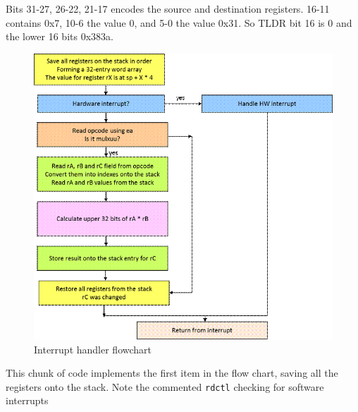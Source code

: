\documentclass[../notes.tex]{subfiles}
\begin{document}
Bits 31-27, 26-22, 21-17 encodes the source and destination registers. 16-11 contains 0x7, 10-6 the value 0, and 5-0 the value 0x31. So TLDR bit 16 is 0 and the lower 16 bits 0x383a.



\begin{figure}[H]
	\centering
	\includegraphics[width=0.8\linewidth]{img/image_2022-11-03-14-30-03.png}
	\caption{Interrupt handler flowchart}
\end{figure}



This chunk of code implements the first item in the flow chart, saving all the registers onto the stack. Note the commented \texttt{rdctl} checking for software interrupts
\end{document}
